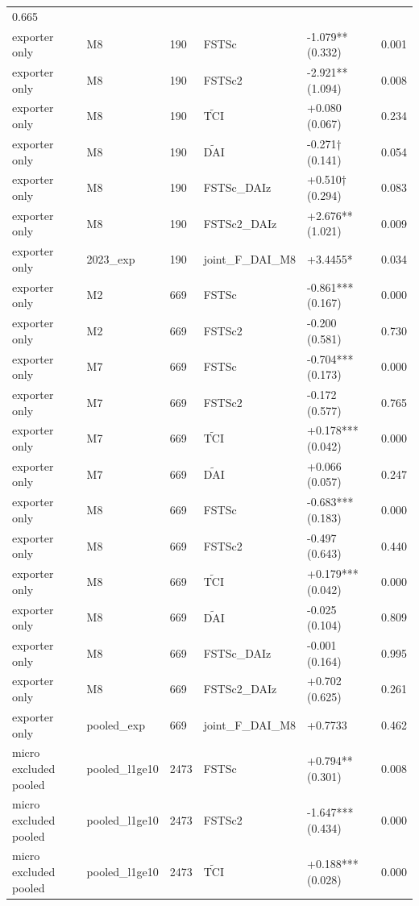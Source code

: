 \documentclass[12pt,a4paper]{article}
\begin{document}
\begin{longtable}[]{@{}llllll@{}}
0.665 \\
exporter only & M8 & 190 & FSTSc & -1.079** (0.332) & 0.001 \\
exporter only & M8 & 190 & FSTSc2 & -2.921** (1.094) & 0.008 \\
exporter only & M8 & 190 & \(\tilde{\mathrm{TCI}}\) & +0.080 (0.067) &
0.234 \\
exporter only & M8 & 190 & \(\tilde{\mathrm{DAI}}\) & -0.271† (0.141) &
0.054 \\
exporter only & M8 & 190 & FSTSc\_DAIz & +0.510† (0.294) & 0.083 \\
exporter only & M8 & 190 & FSTSc2\_DAIz & +2.676** (1.021) & 0.009 \\
exporter only & 2023\_exp & 190 & joint\_F\_DAI\_M8 & +3.4455* &
0.034 \\
exporter only & M2 & 669 & FSTSc & -0.861*** (0.167) & 0.000 \\
exporter only & M2 & 669 & FSTSc2 & -0.200 (0.581) & 0.730 \\
exporter only & M7 & 669 & FSTSc & -0.704*** (0.173) & 0.000 \\
exporter only & M7 & 669 & FSTSc2 & -0.172 (0.577) & 0.765 \\
exporter only & M7 & 669 & \(\tilde{\mathrm{TCI}}\) & +0.178*** (0.042)
& 0.000 \\
exporter only & M7 & 669 & \(\tilde{\mathrm{DAI}}\) & +0.066 (0.057) &
0.247 \\
exporter only & M8 & 669 & FSTSc & -0.683*** (0.183) & 0.000 \\
exporter only & M8 & 669 & FSTSc2 & -0.497 (0.643) & 0.440 \\
exporter only & M8 & 669 & \(\tilde{\mathrm{TCI}}\) & +0.179*** (0.042)
& 0.000 \\
exporter only & M8 & 669 & \(\tilde{\mathrm{DAI}}\) & -0.025 (0.104) &
0.809 \\
exporter only & M8 & 669 & FSTSc\_DAIz & -0.001 (0.164) & 0.995 \\
exporter only & M8 & 669 & FSTSc2\_DAIz & +0.702 (0.625) & 0.261 \\
exporter only & pooled\_exp & 669 & joint\_F\_DAI\_M8 & +0.7733 &
0.462 \\
micro excluded pooled & pooled\_l1ge10 & 2473 & FSTSc & +0.794** (0.301)
& 0.008 \\
micro excluded pooled & pooled\_l1ge10 & 2473 & FSTSc2 & -1.647***
(0.434) & 0.000 \\
micro excluded pooled & pooled\_l1ge10 & 2473 & \(\tilde{\mathrm{TCI}}\)
& +0.188*** (0.028) & 0.000 \\

\end{longtable}
\end{document}
